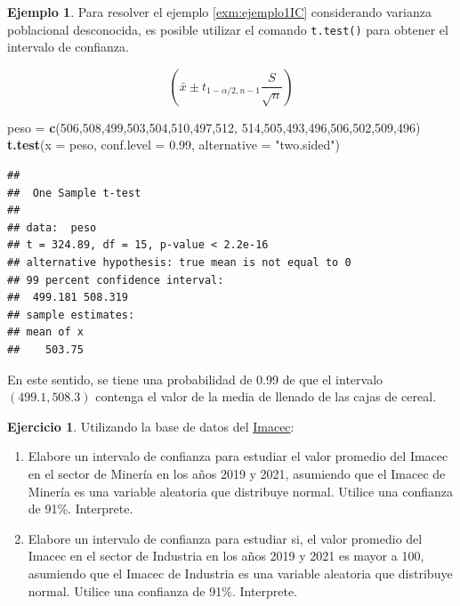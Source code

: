 \documentclass[
  11pt,
]{book}
\newenvironment{Shaded}{\begin{snugshade}}{\end{snugshade}}
\newcommand{\AttributeTok}[1]{\textcolor[rgb]{0.13,0.29,0.53}{#1}}
\newcommand{\DecValTok}[1]{\textcolor[rgb]{0.00,0.00,0.81}{#1}}
\newcommand{\FloatTok}[1]{\textcolor[rgb]{0.00,0.00,0.81}{#1}}
\newcommand{\FunctionTok}[1]{\textcolor[rgb]{0.13,0.29,0.53}{\textbf{#1}}}
\newcommand{\NormalTok}[1]{#1}
\newcommand{\OtherTok}[1]{\textcolor[rgb]{0.56,0.35,0.01}{#1}}
\newcommand{\StringTok}[1]{\textcolor[rgb]{0.31,0.60,0.02}{#1}}
\providecommand{\tightlist}{%
  \setlength{\itemsep}{0pt}\setlength{\parskip}{0pt}}
\theoremstyle{definition}
\theoremstyle{definition}
\newtheorem{example}{Ejemplo}[chapter]
\theoremstyle{definition}
\newtheorem{exercise}{Ejercicio}[chapter]
\theoremstyle{definition}
\theoremstyle{remark}
\begin{document}
\begin{example}
Para resolver el ejemplo \ref{exm:ejemplo1IC} considerando varianza poblacional desconocida, es posible utilizar el comando \texttt{t.test()} para obtener el intervalo de confianza.

\[\left(\bar{x} \pm t_{1-\alpha/2,n-1}\displaystyle\frac{S}{\sqrt{n}} \right)\]

\begin{Shaded}
\begin{Highlighting}[]
\NormalTok{peso }\OtherTok{=} \FunctionTok{c}\NormalTok{(}\DecValTok{506}\NormalTok{,}\DecValTok{508}\NormalTok{,}\DecValTok{499}\NormalTok{,}\DecValTok{503}\NormalTok{,}\DecValTok{504}\NormalTok{,}\DecValTok{510}\NormalTok{,}\DecValTok{497}\NormalTok{,}\DecValTok{512}\NormalTok{,}
         \DecValTok{514}\NormalTok{,}\DecValTok{505}\NormalTok{,}\DecValTok{493}\NormalTok{,}\DecValTok{496}\NormalTok{,}\DecValTok{506}\NormalTok{,}\DecValTok{502}\NormalTok{,}\DecValTok{509}\NormalTok{,}\DecValTok{496}\NormalTok{)}
\FunctionTok{t.test}\NormalTok{(}\AttributeTok{x =}\NormalTok{ peso, }\AttributeTok{conf.level =} \FloatTok{0.99}\NormalTok{, }\AttributeTok{alternative =} \StringTok{"two.sided"}\NormalTok{)}
\end{Highlighting}
\end{Shaded}

\begin{verbatim}
## 
##  One Sample t-test
## 
## data:  peso
## t = 324.89, df = 15, p-value < 2.2e-16
## alternative hypothesis: true mean is not equal to 0
## 99 percent confidence interval:
##  499.181 508.319
## sample estimates:
## mean of x 
##    503.75
\end{verbatim}

En este sentido, se tiene una probabilidad de 0.99 de que el intervalo \((499.1, 508.3)\) contenga el valor de la media de llenado de las cajas de cereal.
\end{example}

\begin{exercise}

Utilizando la base de datos del \hyperref[Imacec]{Imacec}:

\begin{enumerate}
\def\labelenumi{\arabic{enumi}.}
\tightlist
\item
  Elabore un intervalo de confianza para estudiar el valor promedio del Imacec en el sector de Minería en los años 2019 y 2021, asumiendo que el Imacec de Minería es una variable aleatoria que distribuye normal. Utilice una confianza de 91\%. Interprete.
\item
  Elabore un intervalo de confianza para estudiar si, el valor promedio del Imacec en el sector de Industria en los años 2019 y 2021 es mayor a 100, asumiendo que el Imacec de Industria es una variable aleatoria que distribuye normal. Utilice una confianza de 91\%. Interprete.
\end{enumerate}

\end{exercise}
\end{document}
